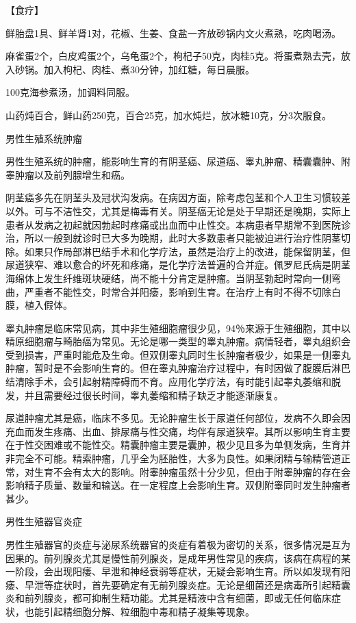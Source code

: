 \documentclass[12pt,UTF8,openany]{ctexbook}
\begin{document}
【食疗】

鲜胎盘1具、鲜羊肾1对，花椒、生姜、食盐一齐放砂锅内文火煮熟，吃肉喝汤。

麻雀蛋2个，白皮鸡蛋2个，乌龟蛋2个，枸杞子50克，肉桂5克。将蛋煮熟去壳，放入砂锅。加入枸杞、肉桂、煮30分钟，加红糖，每日晨服。

100克海参煮汤，加调料同服。

山药炖百合，鲜山药250克，百合25克，加水炖烂，放冰糖10克，分3次服食。





男性生殖系统肿瘤


男性生殖系统的肿瘤，能影响生育的有阴茎癌、尿道癌、睾丸肿瘤、精囊囊肿、附睾肿瘤以及前列腺增生和癌。

阴茎癌多先在阴茎头及冠状沟发病。在病因方面，除考虑包茎和个人卫生习惯较差以外。可与不洁性交，尤其是梅毒有关。阴茎癌无论是处于早期还是晚期，实际上患者从发病之初起就因勃起时疼痛或出血而中止性交。本病患者早期常不到医院诊治，所以一般到就诊时已大多为晚期，此时大多数患者只能被迫进行治疗性阴茎切除。如果只作局部淋巴结手术和化学疗法，虽然是治疗上的改进，能保留阴茎，但尿道狭窄、难以愈合的坏死和疼痛，是化学疗法普遍的合并症。佩罗尼氏病是阴茎海绵体上发生纤维斑块硬结，尚不能十分肯定是肿瘤。当阴茎勃起时常向一侧弯曲，严重者不能性交，时常合并阳痿，影响到生育。在治疗上有时不得不切除白膜，植入假体。

睾丸肿瘤是临床常见病，其中非生殖细胞瘤很少见，94％来源于生殖细胞，其中以精原细胞瘤与畸胎癌为常见。无论是哪一类型的睾丸肿瘤。病情轻者，睾丸组织会受到损害，严重时能危及生命。但双侧睾丸同时生长肿瘤者极少，如果是一侧睾丸肿瘤，暂时是不会影响生育的。但在睾丸肿瘤治疗过程中，有时因做了腹膜后淋巴结清除手术，会引起射精障碍而不育。应用化学疗法，有时能引起睾丸萎缩和脱发，并且需要经过很长时间，睾丸萎缩和精子缺乏才能逐渐康复。

尿道肿瘤尤其是癌，临床不多见。无论肿瘤生长于尿道任何部位，发病不久即会因充血而发生疼痛、出血、排尿痛与性交痛，均伴有尿道狭窄。其所以影响生育主要在于性交困难或不能性交。精囊肿瘤主要是囊肿，极少见且多为单侧发病，生育并非完全不可能。精索肿瘤，几乎全为胚胎性，大多为良性。如果闭精与输精管道正常，对生育不会有太大的影响。附睾肿瘤虽然十分少见，但由于附睾肿瘤的存在会影响精子质量、数量和输送。在一定程度上会影响生育。双侧附睾同时发生肿瘤者甚少。





男性生殖器官炎症


男性生殖器官的炎症与泌尿系统器官的炎症有着极为密切的关系，很多情况是互为因果的。前列腺炎尤其是慢性前列腺炎，是成年男性常见的疾病，该病在病程的某一阶段，会出现阳痿、早泄和神经衰弱等症状，无疑会影响生育。所以如发现有阳痿、早泄等症状时，首先要确定有无前列腺炎症。无论是细菌还是病毒所引起精囊炎和前列腺炎，都可抑制生精功能。尤其是精液中含有细菌，即或无任何临床症状，也能引起精细胞分解、粒细胞中毒和精子凝集等现象。
\end{document}
